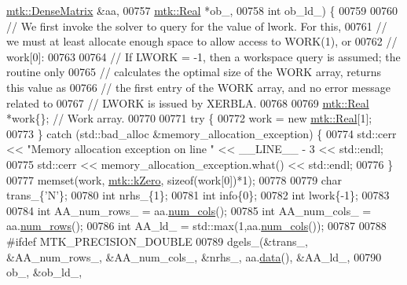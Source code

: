 \begin{DoxyCode}
      \hyperlink{classmtk_1_1DenseMatrix}{mtk::DenseMatrix} &aa,
00757                                                    \hyperlink{group__c01-roots_gac080bbbf5cbb5502c9f00405f894857d}{mtk::Real} *ob\_,
00758                                                    \textcolor{keywordtype}{int} ob\_ld\_) \{
00759 
00760   \textcolor{comment}{// We first invoke the solver to query for the value of lwork. For this,}
00761   \textcolor{comment}{// we must at least allocate enough space to allow access to WORK(1), or}
00762   \textcolor{comment}{// work[0]:}
00763 
00764   \textcolor{comment}{// If LWORK = -1, then a workspace query is assumed; the routine only}
00765   \textcolor{comment}{// calculates the optimal size of the WORK array, returns this value as}
00766   \textcolor{comment}{// the first entry of the WORK array, and no error message related to}
00767   \textcolor{comment}{// LWORK is issued by XERBLA.}
00768 
00769   \hyperlink{group__c01-roots_gac080bbbf5cbb5502c9f00405f894857d}{mtk::Real} *work\{\}; \textcolor{comment}{// Work array.}
00770 
00771   \textcolor{keywordflow}{try} \{
00772     work = \textcolor{keyword}{new} \hyperlink{group__c01-roots_gac080bbbf5cbb5502c9f00405f894857d}{mtk::Real}[1];
00773   \} \textcolor{keywordflow}{catch} (std::bad\_alloc &memory\_allocation\_exception) \{
00774     std::cerr << \textcolor{stringliteral}{"Memory allocation exception on line "} << \_\_LINE\_\_ - 3 << std::endl;
00775     std::cerr << memory\_allocation\_exception.what() << std::endl;
00776   \}
00777   memset(work, \hyperlink{group__c01-roots_ga59a451a5fae30d59649bcda274fea271}{mtk::kZero}, \textcolor{keyword}{sizeof}(work[0])*1);
00778 
00779   \textcolor{keywordtype}{char} trans\_\{\textcolor{charliteral}{'N'}\};
00780   \textcolor{keywordtype}{int} nrhs\_\{1\};
00781   \textcolor{keywordtype}{int} info\{0\};
00782   \textcolor{keywordtype}{int} lwork\{-1\};
00783 
00784   \textcolor{keywordtype}{int} AA\_num\_rows\_  = aa.\hyperlink{classmtk_1_1DenseMatrix_af6f78373aaf2136f0c78974d7c8de0a8}{num\_cols}();
00785   \textcolor{keywordtype}{int} AA\_num\_cols\_  = aa.\hyperlink{classmtk_1_1DenseMatrix_a17d8d3b9cc0926044b6972dd190a5c21}{num\_rows}();
00786   \textcolor{keywordtype}{int} AA\_ld\_ = std::max(1,aa.\hyperlink{classmtk_1_1DenseMatrix_af6f78373aaf2136f0c78974d7c8de0a8}{num\_cols}());
00787 
00788 \textcolor{preprocessor}{  #ifdef MTK\_PRECISION\_DOUBLE}
00789   dgels\_(&trans\_, &AA\_num\_rows\_, &AA\_num\_cols\_, &nrhs\_, aa.\hyperlink{classmtk_1_1DenseMatrix_a16b3ff56feb2658b9fc7147d1de4d8e7}{data}(), &AA\_ld\_,
00790          ob\_, &ob\_ld\_,

\end{DoxyCode}
